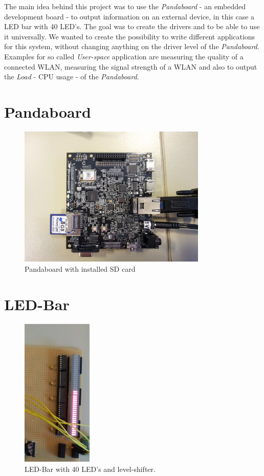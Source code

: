 The main idea behind this project was to use the \textit{Pandaboard} - an embedded development board - to output information on an external device, in this case a LED bar with 40 LED's. The goal was to create the drivers and to be able to use it universally. We wanted to create the possibility to write different applications for this system, without changing anything on the driver level of the \textit{Pandaboard}. 
Examples for so called \textit{User-space} application are measuring the quality of a connected WLAN, measuring the signal strength of a WLAN and also to output the \textit{Load} - CPU usage - of the \textit{Pandaboard}.

\section{Pandaboard}

\begin{figure}[H]
   \centering
   \includegraphics[width=0.8\textwidth]{img/Pandaboard_Alone.jpg}%
   \caption{Pandaboard with installed SD card}
   \label{fig:pandaBoard_Alone}%
\end{figure}

\section{LED-Bar}
\begin{figure}[H]
   \centering
   \includegraphics[width=0.3\textwidth]{img/LED-Bar.png}%
   \caption{LED-Bar with 40 LED's and level-shifter.}
   \label{fig:ledBar}%
\end{figure}

